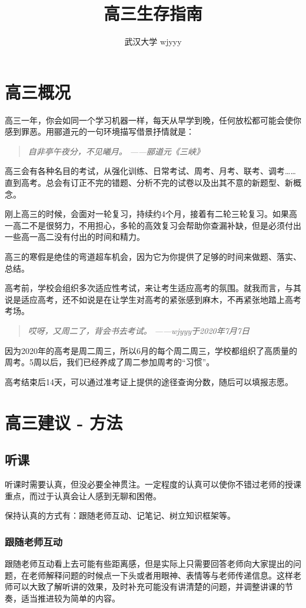 \documentclass[UTF8,11pt,a4paper]{ctexart}
\title{\textbf{高三生存指南}}
\author{武汉大学 wjyyy}
\begin{document}
	\maketitle
	\tableofcontents
	\section{高三概况}
		高三一年，你会如同一个学习机器一样，每天从早学到晚，任何放松都可能会使你感到罪恶。用郦道元的一句环境描写借景抒情就是：
		\begin{quote}
			\textit{自非亭午夜分，不见曦月。}
			\flushright\textit{——郦道元《三峡》}
		\end{quote}
		
		高三会有各种名目的考试，从强化训练、日常考试、周考、月考、联考、调考……直到高考。总会有订正不完的错题、分析不完的试卷以及出其不意的新题型、新概念。
		
		刚上高三的时候，会面对一轮复习，持续约4个月，接着有二轮三轮复习。如果高一高二不是很努力，不用担心，多轮的高效复习会帮助你查漏补缺，但是必须付出一些高一高二没有付出的时间和精力。
		
		高三的寒假是绝佳的弯道超车机会，因为它为你提供了足够的时间来做题、落实、总结。
		
		高考前，学校会组织多次适应性考试，来让考生适应高考的氛围。就我而言，与其说是适应高考，还不如说是在让学生对高考的紧张感到麻木，不再紧张地踏上高考考场。
		
		\begin{quote}
			\textit{哎呀，又周二了，背会书去考试。}
			\flushright\textit{——wjyyy于2020年7月7日}
		\end{quote}
	
		因为2020年的高考是周二周三，所以6月的每个周二周三，学校都组织了高质量的周考。5周以后，我们已经养成了周二参加周考的“习惯”。
		
		高考结束后14天，可以通过准考证上提供的途径查询分数，随后可以填报志愿。
	\section{高三建议 - 方法}
		\subsection{听课}
			听课时需要认真，但没必要全神贯注。一定程度的认真可以使你不错过老师的授课重点，而过于认真会让人感到无聊和困倦。
			
			保持认真的方式有：跟随老师互动、记笔记、树立知识框架等。
			\subsubsection{跟随老师互动}
				跟随老师互动看上去可能有些距离感，但是实际上只需要回答老师向大家提出的问题，在老师解释问题的时候点一下头或者用眼神、表情等与老师传递信息。这样老师可以大致了解听讲的效果，及时补充可能没有讲清楚的问题，并调整讲课的节奏，适当推进较为简单的内容。
				
\end{document}
